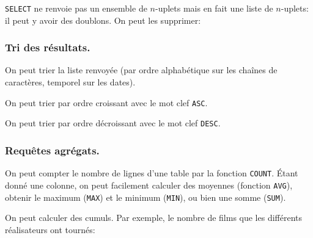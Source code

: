 \texttt{SELECT} ne renvoie pas un ensemble de $n$-uplets mais en fait
une liste de $n$-uplets: il peut y avoir des doublons. On peut les
supprimer:


\begin{center}
\end{center}

\subsubsection{Tri des résultats.}
On peut trier la liste renvoyée (par ordre alphabétique sur les chaînes de caractères, temporel sur les dates).

On peut trier par ordre croissant avec le mot clef \texttt{ASC}.

\begin{center}
\end{center}

On peut trier par ordre décroissant avec le mot clef \texttt{DESC}.

\begin{center}
\end{center}


\subsubsection{Requêtes agrégats.}
On peut compter le nombre de lignes d'une table par la fonction  \texttt{COUNT}.
\'Etant donné une colonne, on peut facilement calculer des moyennes (fonction \texttt{AVG}), obtenir le maximum (\texttt{MAX}) et le minimum (\texttt{MIN}), ou bien une somme (\texttt{SUM}). 

\begin{center}
\end{center}


\begin{center}
\end{center}


On peut calculer des cumuls. Par exemple, le nombre de films que les
différents réalisateurs ont tournés:


\begin{center}
\end{center}


